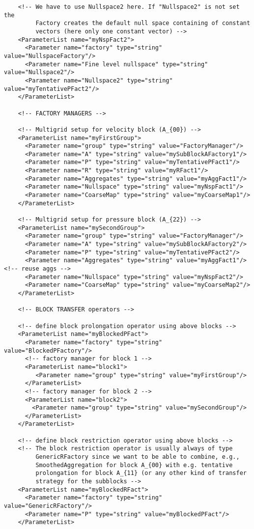 \documentclass[10pt,fleqn]{book}
\begin{document}
\begin{lstlisting}
    <!-- We have to use Nullspace2 here. If "Nullspace2" is not set the
         Factory creates the default null space containing of constant
         vectors (here only one constant vector) -->
    <ParameterList name="myNspFact2">
      <Parameter name="factory" type="string" value="NullspaceFactory"/>
      <Parameter name="Fine level nullspace" type="string" value="Nullspace2"/>
      <Parameter name="Nullspace2" type="string" value="myTentativePFact2"/>
    </ParameterList>

    <!-- FACTORY MANAGERS -->

    <!-- Multigrid setup for velocity block (A_{00}) -->
    <ParameterList name="myFirstGroup">
      <Parameter name="group" type="string" value="FactoryManager"/>
      <Parameter name="A" type="string" value="mySubBlockAFactory1"/>
      <Parameter name="P" type="string" value="myTentativePFact1"/>
      <Parameter name="R" type="string" value="myRFact1"/>
      <Parameter name="Aggregates" type="string" value="myAggFact1"/>
      <Parameter name="Nullspace" type="string" value="myNspFact1"/>
      <Parameter name="CoarseMap" type="string" value="myCoarseMap1"/>
    </ParameterList>

    <!-- Multigrid setup for pressure block (A_{22}) -->
    <ParameterList name="mySecondGroup">
      <Parameter name="group" type="string" value="FactoryManager"/>
      <Parameter name="A" type="string" value="mySubBlockAFactory2"/>
      <Parameter name="P" type="string" value="myTentativePFact2"/>
      <Parameter name="Aggregates" type="string" value="myAggFact1"/><!-- reuse aggs -->
      <Parameter name="Nullspace" type="string" value="myNspFact2"/>
      <Parameter name="CoarseMap" type="string" value="myCoarseMap2"/>
    </ParameterList>

    <!-- BLOCK TRANSFER operators -->

    <!-- define block prolongation operator using above blocks -->
    <ParameterList name="myBlockedPFact">
      <Parameter name="factory" type="string" value="BlockedPFactory"/>
      <!-- factory manager for block 1 -->
      <ParameterList name="block1">
         <Parameter name="group" type="string" value="myFirstGroup"/>
      </ParameterList>
      <!-- factory manager for block 2 -->
      <ParameterList name="block2">
        <Parameter name="group" type="string" value="mySecondGroup"/>
      </ParameterList>
    </ParameterList>

    <!-- define block restriction operator using above blocks -->
    <!-- The block restriction operator is usually always of type
         GenericRFactory since we want to be able to combine, e.g.,
         SmoothedAggregation for block A_{00} with e.g. tentative
         prolongation for block A_{11} (or any other kind of transfer
         strategy for the subblocks -->
    <ParameterList name="myBlockedRFact">
      <Parameter name="factory" type="string" value="GenericRFactory"/>
      <Parameter name="P" type="string" value="myBlockedPFact"/>
    </ParameterList>


\end{lstlisting}
\end{document}
